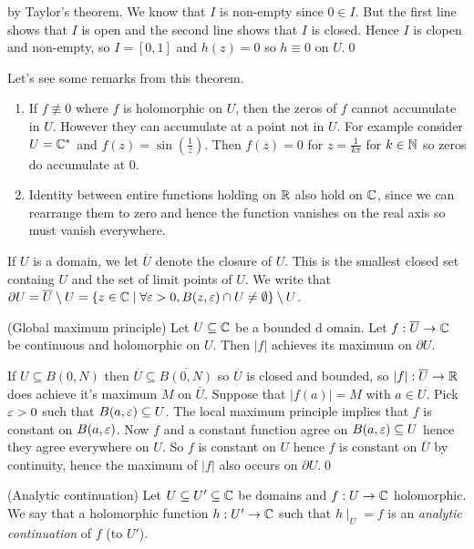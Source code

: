 \documentclass{article}
\begin{document}
by Taylor's theorem. We know that $ I $ is non-empty since $ 0\in I $. But the first line shows that $ I $ is open and the second line shows that $ I $ is closed. Hence $ I $ is clopen and non-empty, so $ I = [0,1] $ and $ h(z) = 0 $ so $ h\equiv 0 $ on $ U $.\qed
\begin{remark}
Let's see some remarks from this theorem.
  \begin{enumerate}
	  \item If $ f\not\equiv 0 $ where $ f $ is holomorphic on $ U $, then the zeros of $ f $ cannot accumulate in $ U $. However they can accumulate at a point not in $ U $. For example consider $ U = \mathbb{C}^* $ and $ f(z) =\sin\left(\frac 1z\right) $. Then $ f(z) = 0 $ for $ z= \frac 1{k\pi} $ for $ k\in \mathbb{N} $ so zeros do accumulate at $ 0 $.
	  \item Identity between entire functions holding on $ \mathbb{R} $ also hold on $ \mathbb{C} $, since we can rearrange them to zero and hence the function vanishes on the real axis so must vanish everywhere.
  \end{enumerate}
\end{remark}
If $ U $ is a domain, we let $ \overline U $ denote the closure of $ U $. This is the smallest closed set containg $ U $ and the set of limit points of $ U $. We write that $ \partial U = \overline U \setminus U = \{z\in \mathbb{C} \mid \forall \varepsilon > 0, B(z,\varepsilon) \cap U \ne \emptyset\} \setminus U $.
\begin{corollary}
	(Global maximum principle) Let $ U\subseteq \mathbb{C} $ be a bounded d omain. Let $ f:\overline U \to \mathbb{C} $ be continuous and holomorphic on $ U $. Then $ |f| $ achieves its maximum on $ \partial U $.
\end{corollary}
\pf If $ U \subseteq B(0,N) $ then $ \overline U \subseteq \overline{B(0,N)} $ so $ \overline U $ is closed and bounded, so $ |f|:\overline U \to \mathbb{R} $ does achieve it's maximum $ M $ on $ \overline U $. Suppose that $ |f(a)| = M $ with $ a\in U $. Pick $ \varepsilon> 0 $ such that $ B(a,\varepsilon) \subseteq U $. The local maximum principle implies that $ f $ is constant on $ B(a,\varepsilon) $. Now $ f $ and a constant function agree on $ B(a,\varepsilon) \subseteq U $ hence they agree everywhere on $ U $. So $ f $ is constant on $ U $ hence $ f $ is constant on $ \overline U $ by continuity, hence the maximum of $ |f| $ also occurs on $ \partial U $.\qed
\begin{definition}
	(Analytic continuation) Let $ U\subseteq U'\subseteq \mathbb{C} $ be domains and $ f:U\to \mathbb{C} $ holomorphic. We say that a holomorphic function $ h: U'\to \mathbb{C} $ such that $ h\mid_U = f $ is an \textit{analytic continuation} of $ f $ (to $ U' $).
\end{definition}
\end{document}
